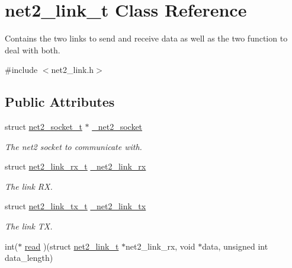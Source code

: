 \hypertarget{structnet2__link__t}{\section{net2\-\_\-link\-\_\-t Class Reference}
\label{structnet2__link__t}
}


Contains the two links to send and receive data as well as the two function to deal with both.  




{\ttfamily \#include $<$net2\-\_\-link.\-h$>$}

\subsection*{Public Attributes}
\begin{DoxyCompactItemize}
\item 
\hypertarget{structnet2__link__t_a8f65f2ed0fbce1980d459461be98b761}{struct \hyperlink{structnet2__socket__t}{net2\-\_\-socket\-\_\-t} $\ast$ \hyperlink{structnet2__link__t_a8f65f2ed0fbce1980d459461be98b761}{\-\_\-net2\-\_\-socket}}\label{structnet2__link__t_a8f65f2ed0fbce1980d459461be98b761}

\begin{DoxyCompactList}\small\item\em The net2 socket to communicate with. \end{DoxyCompactList}\item 
\hypertarget{structnet2__link__t_ad80d872bae84888fec67048269d55a4b}{struct \hyperlink{structnet2__link__rx__t}{net2\-\_\-link\-\_\-rx\-\_\-t} \hyperlink{structnet2__link__t_ad80d872bae84888fec67048269d55a4b}{\-\_\-net2\-\_\-link\-\_\-rx}}\label{structnet2__link__t_ad80d872bae84888fec67048269d55a4b}

\begin{DoxyCompactList}\small\item\em The link R\-X. \end{DoxyCompactList}\item 
\hypertarget{structnet2__link__t_a4c167a94d5b5be0e8ecd8d719ba72bcd}{struct \hyperlink{structnet2__link__tx__t}{net2\-\_\-link\-\_\-tx\-\_\-t} \hyperlink{structnet2__link__t_a4c167a94d5b5be0e8ecd8d719ba72bcd}{\-\_\-net2\-\_\-link\-\_\-tx}}\label{structnet2__link__t_a4c167a94d5b5be0e8ecd8d719ba72bcd}

\begin{DoxyCompactList}\small\item\em The link T\-X. \end{DoxyCompactList}\item 
\hypertarget{structnet2__link__t_a4a95768a698152d1be5dc2b416581a49}{int($\ast$ \hyperlink{structnet2__link__t_a4a95768a698152d1be5dc2b416581a49}{read} )(struct \hyperlink{structnet2__link__t}{net2\-\_\-link\-\_\-t} $\ast$net2\-\_\-link\-\_\-rx, void $\ast$data, unsigned int data\-\_\-length)}\label{structnet2__link__t_a4a95768a698152d1be5dc2b416581a49}


\end{DoxyCompactItemize}

